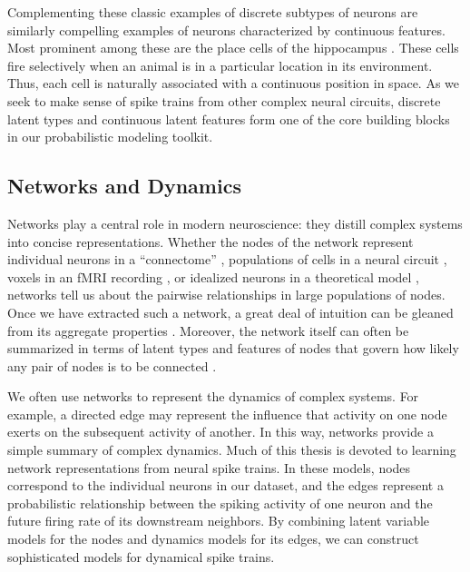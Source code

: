 Complementing these classic examples of discrete subtypes of neurons 
are similarly compelling examples of neurons characterized by 
continuous features. Most prominent among these are the place cells 
of the hippocampus \citep{OKeefe78}. These cells fire selectively 
when an animal is in a particular location in its environment. Thus,
each cell is naturally associated with a continuous position in 
space. As we seek to make sense of spike trains from other complex neural circuits, 
discrete latent types and continuous latent features form one of the
core building blocks in our probabilistic modeling toolkit. 


\subsection{Networks and Dynamics}
Networks play a central role in modern neuroscience: they distill
complex systems into concise representations. Whether the
nodes of the network represent individual neurons in a ``connectome''
\citep[e.g.]{sporns2005human}, populations of cells in a neural circuit
\citep[e.g.]{felleman1991distributed}, voxels in an fMRI recording
\citep[e.g.]{friston1994functional}, or idealized neurons in a
theoretical model \citep[e.g.]{hopfield1982neural}, networks tell us
about the pairwise relationships in large populations of nodes.  Once we have 
extracted such a network, a great deal of intuition can be gleaned 
from its aggregate properties \citep{bullmore2009complex, newman2003structure}.
Moreover, the network itself can often be summarized in terms of 
latent types and features of nodes that govern how likely any 
pair of nodes is to be connected \citep{Goldenberg-2010}.

We often use networks to represent the dynamics of complex systems.
For example, a directed edge may represent the influence that activity
on one node exerts on the subsequent activity of another. In this way,
networks provide a simple summary of complex dynamics. Much of this 
thesis is devoted to learning network representations from neural 
spike trains. In these models, nodes correspond to the individual 
neurons in our dataset, and the edges represent a probabilistic 
relationship between the spiking activity of one neuron and the 
future firing rate of its downstream neighbors.  By combining 
latent variable models for the nodes and dynamics models for its edges, 
we can construct sophisticated models for dynamical spike trains.



